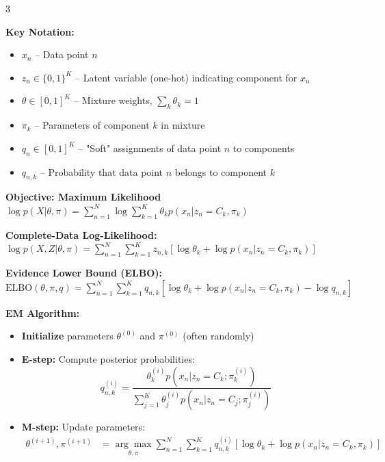 \documentclass[10pt,landscape]{article}
\begin{document}
\begin{multicols}{3}
\begin{tcolorbox}[breakable, title=Expectation-Maximization (EM) Algorithm, colback=em, boxsep=1pt, left=1pt, right=1pt, top=1pt, bottom=1pt]
\textbf{Key Notation:}
\begin{itemize}[leftmargin=*,noitemsep,topsep=0pt]
    \item $x_n$ -- Data point $n$
    \item $z_n \in \{0,1\}^K$ -- Latent variable (one-hot) indicating component for $x_n$
    \item $\theta \in [0,1]^K$ -- Mixture weights, $\sum_k \theta_k = 1$
    \item $\pi_k$ -- Parameters of component $k$ in mixture
    \item $q_n \in [0,1]^K$ -- "Soft" assignments of data point $n$ to components
    \item $q_{n,k}$ -- Probability that data point $n$ belongs to component $k$
\end{itemize}

\textbf{Objective: Maximum Likelihood}
$\log p(X|\theta, \pi) = \sum_{n=1}^N \log \sum_{k=1}^K \theta_k p(x_n|z_n = C_k, \pi_k)$

\textbf{Complete-Data Log-Likelihood:}
$\log p(X, Z|\theta, \pi) = \sum_{n=1}^N \sum_{k=1}^K z_{n,k}[\log \theta_k + \log p(x_n|z_n = C_k, \pi_k)]$

\textbf{Evidence Lower Bound (ELBO):}
$\text{ELBO}(\theta, \pi, q) = \sum_{n=1}^N \sum_{k=1}^K q_{n,k}[\log \theta_k + \log p(x_n|z_n = C_k, \pi_k) - \log q_{n,k}]$

\textbf{EM Algorithm:}
\begin{itemize}[leftmargin=*,noitemsep,topsep=0pt]
    \item \textbf{Initialize} parameters $\theta^{(0)}$ and $\pi^{(0)}$ (often randomly)
    
    \item \textbf{E-step:} Compute posterior probabilities:
    \begin{equation}
    q_{n,k}^{(i)} = \frac{\theta_k^{(i)} p(x_n|z_n = C_k; \pi_k^{(i)})}{\sum_{j=1}^K \theta_j^{(i)} p(x_n|z_n = C_j; \pi_j^{(i)})}
    \end{equation}
    
    \item \textbf{M-step:} Update parameters:
    \begin{align}
    \theta^{(i+1)}, \pi^{(i+1)} &= \underset{\theta, \pi}{\arg\max} \sum_{n=1}^N \sum_{k=1}^K q_{n,k}^{(i)}[\log \theta_k + \log p(x_n|z_n = C_k, \pi_k)]
    \end{align}
    

\end{itemize}
\end{tcolorbox}
\end{multicols}
\end{document}
